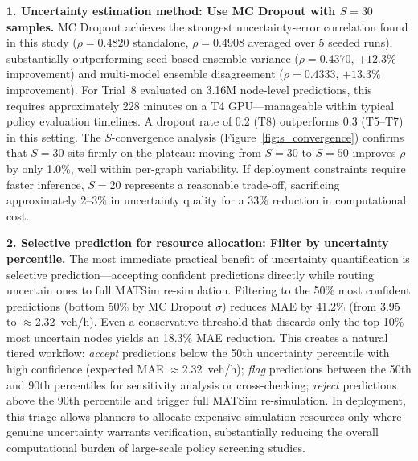 \textbf{1. Uncertainty estimation method: Use MC Dropout with $S = 30$ samples.} MC Dropout achieves the strongest uncertainty-error correlation found in this study ($\rho = 0.4820$ standalone, $\rho = 0.4908$ averaged over 5 seeded runs), substantially outperforming seed-based ensemble variance ($\rho = 0.4370$, $+12.3\%$ improvement) and multi-model ensemble disagreement ($\rho = 0.4333$, $+13.3\%$ improvement). For Trial~8 evaluated on 3.16M node-level predictions, this requires approximately 228 minutes on a T4 GPU---manageable within typical policy evaluation timelines. A dropout rate of 0.2 (T8) outperforms 0.3 (T5--T7) in this setting. The $S$-convergence analysis (Figure~\ref{fig:s_convergence}) confirms that $S = 30$ sits firmly on the plateau: moving from $S = 30$ to $S = 50$ improves $\rho$ by only 1.0\%, well within per-graph variability. If deployment constraints require faster inference, $S = 20$ represents a reasonable trade-off, sacrificing approximately 2--3\% in uncertainty quality for a 33\% reduction in computational cost.

\textbf{2. Selective prediction for resource allocation: Filter by uncertainty percentile.} The most immediate practical benefit of uncertainty quantification is selective prediction---accepting confident predictions directly while routing uncertain ones to full MATSim re-simulation. Filtering to the 50\% most confident predictions (bottom 50\% by MC Dropout $\sigma$) reduces MAE by 41.2\% (from 3.95 to $\approx$2.32~veh/h). Even a conservative threshold that discards only the top 10\% most uncertain nodes yields an 18.3\% MAE reduction. This creates a natural tiered workflow: \emph{accept} predictions below the 50th uncertainty percentile with high confidence (expected MAE $\approx$2.32~veh/h); \emph{flag} predictions between the 50th and 90th percentiles for sensitivity analysis or cross-checking; \emph{reject} predictions above the 90th percentile and trigger full MATSim re-simulation. In deployment, this triage allows planners to allocate expensive simulation resources only where genuine uncertainty warrants verification, substantially reducing the overall computational burden of large-scale policy screening studies.

